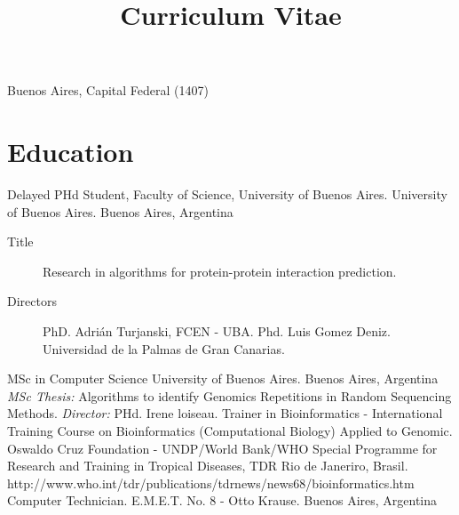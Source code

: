 
\newcommand{\Q}{{\textsf{Q}\hspace*{-1.1ex}%
  \rule{0.15ex}{1.5ex}\hspace*{1.1ex}}}
\newcommand{\Cuat}{º\Q~}
\newcommand{\actual}{$\infty$}


\title{Curriculum Vitae}
\address{Av. Rivadaivia 9858 8°D}{Buenos Aires, Capital Federal (1407)}


\newcommand{\DC}{Computer Department}
\newcommand{\FCEN}{Faculty of Science}
\newcommand{\UBA}{University of Buenos Aires}
\newcommand{\CS}{MSc in Computer Science}



\makecvtitle

\section{Education}\label{otros:desde}

	{Delayed PHd Student, \FCEN, \UBA.}
	{\UBA.}
	{Buenos Aires, Argentina}
	{}
	{\begin{description}
	\item [Title] Research in algorithms for protein-protein interaction prediction.
	\item [Directors] PhD. Adrián Turjanski, FCEN - UBA. Phd. Luis Gomez Deniz. Universidad de la Palmas de Gran Canarias.
	\end{description}}
	{\CS}
	{\UBA.}
	{Buenos Aires, Argentina}
	{}
	{\emph{MSc Thesis:} Algorithms to identify Genomics Repetitions in Random Sequencing Methods. \emph{Director:} PHd. Irene loiseau.}
	{Trainer in Bioinformatics - International Training Course on Bioinformatics (Computational Biology) Applied to Genomic.}
	{Oswaldo Cruz Foundation - UNDP/World Bank/WHO Special Programme for Research and Training in Tropical Diseases, TDR}
	{Rio de Janeriro, Brasil.}
	{}
	{http://www.who.int/tdr/publications/tdrnews/news68/bioinformatics.htm}
	{Computer Technician.}
	{E.M.E.T. No. 8 - Otto Krause.}
	{Buenos Aires, Argentina}
	{}
	{}

